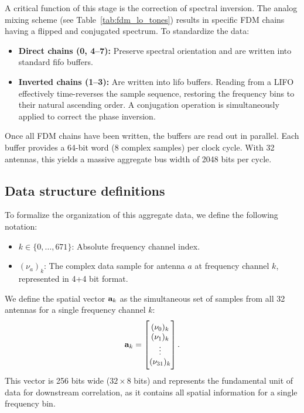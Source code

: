 A critical function of this stage is the correction of spectral inversion. The analog mixing scheme (see Table~\ref{tab:fdm_lo_tones}) results in specific FDM chains having a flipped and conjugated spectrum. To standardize the data:
\begin{itemize}
    \item \textbf{Direct chains (0, 4--7):} Preserve spectral orientation and are written into standard \gls{fifo} buffers.
    \item \textbf{Inverted chains (1--3):} Are written into \gls{lifo} buffers. Reading from a LIFO effectively time-reverses the sample sequence, restoring the frequency bins to their natural ascending order. A conjugation operation is simultaneously applied to correct the phase inversion.
\end{itemize}

Once all FDM chains have been written, the buffers are read out in parallel. Each buffer provides a 64-bit word (8 complex samples) per clock cycle. With 32 antennas, this yields a massive aggregate bus width of \num{2048} bits per cycle.

\subsection{Data structure definitions}

To formalize the organization of this aggregate data, we define the following notation:
\begin{itemize}
    \item $k \in \{0,\dots,671\}$: Absolute frequency channel index.
    \item $(\nu_a)_k$: The complex data sample for antenna $a$ at frequency channel $k$, represented in 4+4 bit format.
\end{itemize}

We define the spatial vector $\mathbf{a}_{k}$ as the simultaneous set of samples from all 32 antennas for a single frequency channel $k$:
\begin{equation}
    \mathbf{a}_{k} = \begin{bmatrix}
        (\nu_0)_k \\
        (\nu_1)_k \\
        \vdots \\
        (\nu_{31})_k
    \end{bmatrix}.
\end{equation}
This vector is 256 bits wide ($32 \times 8$ bits) and represents the fundamental unit of data for downstream correlation, as it contains all spatial information for a single frequency bin.


